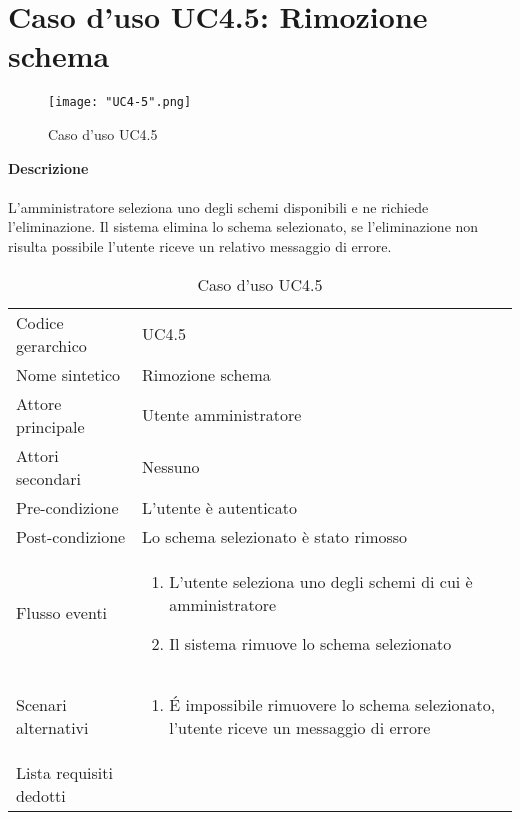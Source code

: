 \documentclass[a4paper]{report}
\begin{document}
	\section{Caso d'uso UC4.5: Rimozione schema}
	 	\begin{figure}[H]
			\centering
			\texttt{[image: "UC4-5".png]}
			\caption{Caso d'uso UC4.5}
		\end{figure}
	 \textbf{Descrizione} \\ \\
	 L'amministratore seleziona uno degli schemi disponibili e ne richiede l'eliminazione. Il sistema elimina
	 lo schema selezionato, se l'eliminazione non risulta possibile l'utente riceve un relativo messaggio di 
	 errore.
		\begin{table}[H]
		\begin{tabularx}{\textwidth}{X | X}\toprule
			\rowcolor{orange!65}Codice gerarchico & UC4.5 \\
			Nome sintetico & Rimozione schema \\
			\rowcolor{orange!65}Attore principale & Utente amministratore\\
			Attori secondari & Nessuno \\
			\rowcolor{orange!65}Pre-condizione & L'utente è autenticato\\
			Post-condizione & Lo schema selezionato è stato rimosso \\
			\rowcolor{orange!65}Flusso eventi & \begin{enumerate}
			\item L'utente seleziona uno degli schemi di cui è amministratore
			\item Il sistema rimuove lo schema selezionato
			\end{enumerate} \\
			Scenari alternativi & \begin{enumerate}
			\item \'E impossibile rimuovere lo schema selezionato, l'utente riceve un messaggio di errore
			\end{enumerate} \\
			\rowcolor{orange!65}Lista requisiti dedotti & \\
			\bottomrule
		\end{tabularx}
		\caption{Caso d'uso UC4.5}
	 \end{table}
\end{document}

